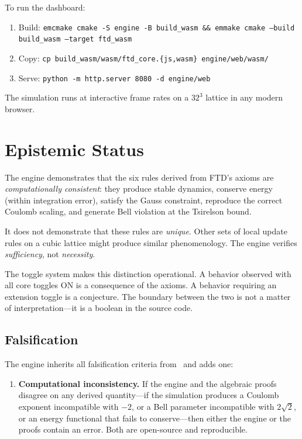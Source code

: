 \documentclass[11pt,a4paper]{article}
\theoremstyle{compact}
\begin{document}
To run the dashboard:
\begin{enumerate}[nosep]
\item Build: \texttt{emcmake cmake -S engine -B build\_wasm \&\& emmake cmake --build build\_wasm --target ftd\_wasm}
\item Copy: \texttt{cp build\_wasm/wasm/ftd\_core.\{js,wasm\} engine/web/wasm/}
\item Serve: \texttt{python -m http.server 8080 -d engine/web}
\end{enumerate}
The simulation runs at interactive frame rates on a $32^3$ lattice in any modern browser.


\section{Epistemic Status}
\label{sec:epistemic}

The engine demonstrates that the six rules derived from FTD's axioms are \emph{computationally consistent}: they produce stable dynamics, conserve energy (within integration error), satisfy the Gauss constraint, reproduce the correct Coulomb scaling, and generate Bell violation at the Tsirelson bound.

It does not demonstrate that these rules are \emph{unique}. Other sets of local update rules on a cubic lattice might produce similar phenomenology. The engine verifies \emph{sufficiency}, not \emph{necessity}.

The toggle system makes this distinction operational. A behavior observed with all core toggles ON is a consequence of the axioms. A behavior requiring an extension toggle is a conjecture. The boundary between the two is not a matter of interpretation---it is a boolean in the source code.

\subsection*{Falsification}

The engine inherits all falsification criteria from~\cite{lifecycle} and adds one:

\begin{enumerate}[nosep]
\item[\textbf{F8.}] \textbf{Computational inconsistency.} If the engine and the algebraic proofs~\cite{chain} disagree on any derived quantity---if the simulation produces a Coulomb exponent incompatible with $-2$, or a Bell parameter incompatible with $2\sqrt{2}$, or an energy functional that fails to conserve---then either the engine or the proofs contain an error. Both are open-source and reproducible.
\end{enumerate}
\end{document}
